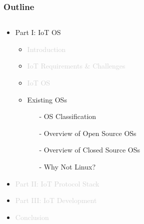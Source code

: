 \documentclass{beamer}
\begin{document}
\begin{frame}
	\frametitle{Outline}
	\begin{columns}[c]
		\begin{column}{30cm}
			\vspace{.1cm}
			\begin{itemize}
				\justifying
				\item Part I: IoT OS
				\begin{itemize}
					\item \textcolor{LightGray}{Introduction}
					\item \textcolor{LightGray}{IoT Requirements \& Challenges}
					\item \textcolor{LightGray}{IoT OS}
					\item {Existing OSs}
					\begin{itemize}
						\item[-] OS Classification
						\item[-] Overview of Open Source OSs
						\item[-] Overview of Closed Source OSs
						\item[-] Why Not Linux?
					\end{itemize}
				\end{itemize}
				\item \textcolor{LightGray}{Part II: IoT Protocol Stack}
				\item \textcolor{LightGray}{Part III: IoT Development}
				\item \textcolor{LightGray}{Conclusion}
			\end{itemize}
		\end{column}
	\end{columns}
\end{frame}
\end{document}
